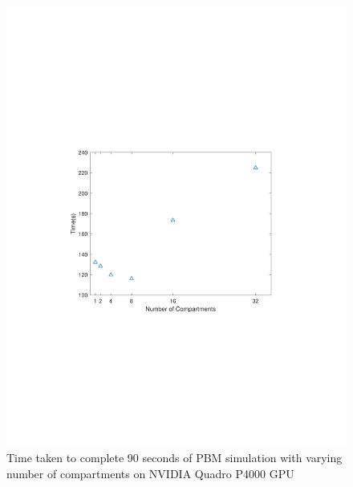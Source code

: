 \documentclass[preprint,10pt,authoryear,review]{elsarticle}
\begin{document}
\begin{linenumbers}
\begin{figure}[h]
\centering
\includegraphics[scale=0.7,trim=110 220 120 220, clip]{desktopgputiming.pdf}
\caption{Time taken to complete 90 seconds of PBM simulation with varying number of compartments 
on NVIDIA Quadro P4000 GPU}
\label{fig:res_gpu_timings}
\end{figure}



\end{linenumbers}
\end{document}
